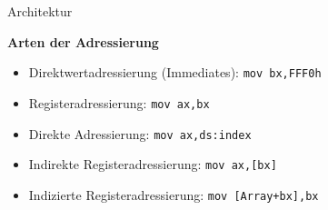 \begin{frame}{Architektur}
    \begin{center}
    \textbf{Arten der Adressierung}
    \end{center}

    \begin{itemize}
        \item Direktwertadressierung (Immediates): {\tt mov bx,FFF0h}
        \item Registeradressierung: {\tt mov    ax,bx}
        \item Direkte Adressierung: {\tt mov    ax,ds:index}
        \item Indirekte Registeradressierung: {\tt mov ax,[bx]}
        \item Indizierte Registeradressierung: {\tt mov [Array+bx],bx}
    \end{itemize}
\end{frame}
